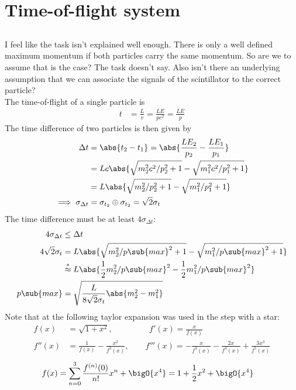 \documentclass[exb, en]{exercise_5.0}
\begin{document}
\section{Time-of-flight system}
\subsection{}
I feel like the task isn't explained well enough. There is only a well defined \glqq maximum momentum\grqq{} if both particles carry the same momentum. So are we to assume that is the case? The task doesn't say. Also isn't there an underlying assumption that we can associate the signals of the scintillator to the correct particle?\\

The time-of-flight of a single particle is 
\begin{align*}
    t &= \frac{L}{v} = \frac{L E}{pc^2} =   \frac{LE}{p}
\end{align*}
The time difference of two particles is then given by
\begin{align*}
    \Delta t &= \abs{t_2 - t_1} 
    = \abs{\frac{L E_2}{p_2} - \frac{L E_1}{p_1}}\\
    &= Lc\abs{\sqrt{m_2^2 c^2/p_2^2  + 1} - \sqrt{m_1^2 c^2/p_1^2  + 1}}\\
    &= L\abs{\sqrt{m_2^2/p_2^2  + 1} - \sqrt{m_1^2/p_1^2  + 1}}\\
    \implies\sigma_{\Delta t} &= \sigma_{t_2}\oplus \sigma_{t_2}=\sqrt 2\sigma_t
\end{align*}
The time difference must be at least $4\sigma_{\Delta t}$:
\begin{align*}
    4\sigma_{\Delta t} &\le \Delta t \\
    4\sqrt 2\sigma_t 
    &= L\abs{\sqrt{m_2^2/p\sub{max}^2  + 1} - \sqrt{m_1^2/p\sub{max}^2  + 1}}\\
    &\overset*{\approx} L\abs{\frac12 m_2^2/p\sub{max}^2- \frac12 m_1^2/p\sub{max}^2}\\
    p\sub{max}&= \sqrt{\frac{L}{8\sqrt2 \sigma_t}\abs{m_2^2- m_1^2}}\\
\end{align*}
Note that at the following taylor expansion was used in the step with a star:
\begin{align*}
    f(x) &= \sqrt{1+x^2},
    \qquad\qquad \ \  f'(x) = \frac x{f(x)}\\
    f''(x) &= \frac1{f(x)}-\frac{x^2}{f^3(x)},
    \qquad f'''(x) = -\frac x{f^3(x)} - \frac{2x}{f^3(x)} + \frac{3x^3}{f^5(x)}
\end{align*}
\begin{align*}    
    f(x) &= \sum_{n=0}^3 \frac{f^{(n)}(0)}{n!}x^n + \bigO{x^4} 
    = 1  + \frac12{x^2} + \bigO{x^4}
\end{align*}
\end{document}
